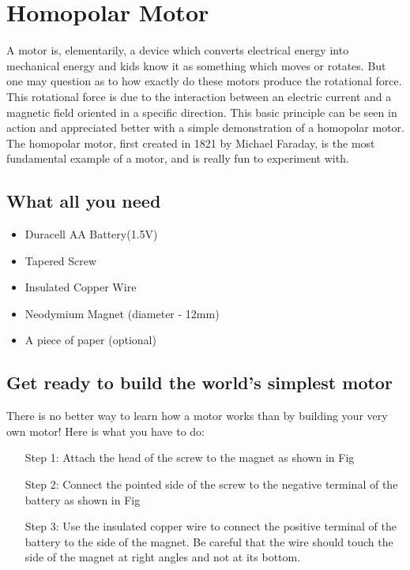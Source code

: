\cleardoublepage
{} %

\chapter{Homopolar Motor}
A motor is, elementarily, a device which converts electrical energy into
mechanical energy and kids know it as something which moves or rotates.
But one may question as to how exactly do these motors produce the rotational
force. This rotational force is due to the interaction between an electric current
and a magnetic field oriented in a specific direction. This basic principle can
be seen in action and appreciated better with a simple demonstration of a
homopolar motor. The homopolar motor, first created in 1821 by Michael
Faraday, is the most fundamental example of a motor, and is really fun to
experiment with.

\section{What all you need}
\begin{itemize}
    \item Duracell AA Battery(1.5V)
    \item Tapered Screw
    \item Insulated Copper Wire
    \item Neodymium Magnet (diameter - 12mm)
    \item A piece of paper (optional)
\end{itemize}

\section{Get ready to build the world’s simplest motor}
There is no better way to learn how a motor works than by building your very
own motor! Here is what you have to do:
\begin{itemize}
    \item[Step 1:] Attach the head of the screw to the magnet as shown in Fig
    \item[Step 2:] Connect the pointed side of the screw to the negative terminal of the battery as shown in Fig 
    \item[Step 3:] Use the insulated copper wire to connect the positive terminal of the battery to the side of the 
        magnet. Be careful that the wire should touch the side of the magnet at right angles and not at its bottom. 
\end{itemize}

